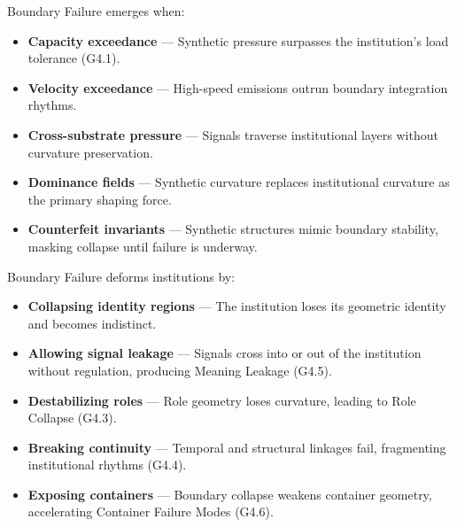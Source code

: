 \medskip

\noindent Boundary Failure emerges when:

\begin{itemize}[leftmargin=1.2cm]
    \item \textbf{Capacity exceedance} — Synthetic pressure surpasses the
    institution’s load tolerance (G4.1).

    \item \textbf{Velocity exceedance} — High-speed emissions outrun boundary
    integration rhythms.

    \item \textbf{Cross-substrate pressure} — Signals traverse institutional
    layers without curvature preservation.

    \item \textbf{Dominance fields} — Synthetic curvature replaces institutional
    curvature as the primary shaping force.

    \item \textbf{Counterfeit invariants} — Synthetic structures mimic boundary
    stability, masking collapse until failure is underway.
\end{itemize}

\medskip

\noindent Boundary Failure deforms institutions by:

\begin{itemize}[leftmargin=1.2cm]
    \item \textbf{Collapsing identity regions} — The institution loses its
    geometric identity and becomes indistinct.

    \item \textbf{Allowing signal leakage} — Signals cross into or out of the
    institution without regulation, producing Meaning Leakage (G4.5).

    \item \textbf{Destabilizing roles} — Role geometry loses curvature, leading
    to Role Collapse (G4.3).

    \item \textbf{Breaking continuity} — Temporal and structural linkages fail,
    fragmenting institutional rhythms (G4.4).

    \item \textbf{Exposing containers} — Boundary collapse weakens container
    geometry, accelerating Container Failure Modes (G4.6).
\end{itemize}

\medskip

